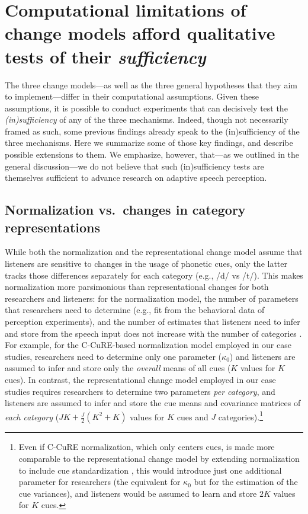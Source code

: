 \documentclass[
  11pt,
  man,floatsintext]{apa6}
\begin{document}
\section{\texorpdfstring{Computational limitations of change models afford qualitative tests of their \emph{sufficiency}}{Computational limitations of change models afford qualitative tests of their sufficiency}}\label{sec:sufficiency}

The three change models---as well as the three general hypotheses that they aim to implement---differ in their computational assumptions. Given these assumptions, it is possible to conduct experiments that can decisively test the \emph{(in)sufficiency} of any of the three mechanisms. Indeed, though not necessarily framed as such, some previous findings already speak to the (in)sufficiency of the three mechanisms. Here we summarize some of those key findings, and describe possible extensions to them. We emphasize, however, that---as we outlined in the general discussion---we do not believe that such (in)sufficiency tests are themselves sufficient to advance research on adaptive speech perception.

\subsection{Normalization vs.~changes in category representations}\label{normalization-vs.-changes-in-category-representations}

While both the normalization and the representational change model assume that listeners are sensitive to changes in the usage of phonetic cues, only the latter tracks those differences separately for each category (e.g., /d/ vs /t/). This makes normalization more parsimonious than representational changes for both researchers and listeners: for the normalization model, the number of parameters that researchers need to determine (e.g., fit from the behavioral data of perception experiments), and the number of estimates that listeners need to infer and store from the speech input does not increase with the number of categories \autocite[for related discussion, see also][]{apfelbaum-mcmurray2015}. For example, for the C-CuRE-based normalization model employed in our case studies, researchers need to determine only one parameter (\(\kappa_0\)) and listeners are assumed to infer and store only the \emph{overall} means of all cues (\(K\) values for \(K\) cues). In contrast, the representational change model employed in our case studies requires researchers to determine two parameters \emph{per category}, and listeners are assumed to infer and store the cue means and covariance matrices of \emph{each category} (\(JK + \frac{J}{2}(K^2+K)\) values for \(K\) cues and \(J\) categories).\footnote{Even if C-CuRE normalization, which only centers cues, is made more comparable to the representational change model by extending normalization to include cue standardization \autocite[also known as z-scoring, as used in, e.g., Lobanov normalization,][]{lobanov1971}, this would introduce just one additional parameter for researchers (the equivalent for \(\kappa_0\) but for the estimation of the cue variances), and listeners would be assumed to learn and store \(2K\) values for \(K\) cues.}
\end{document}
